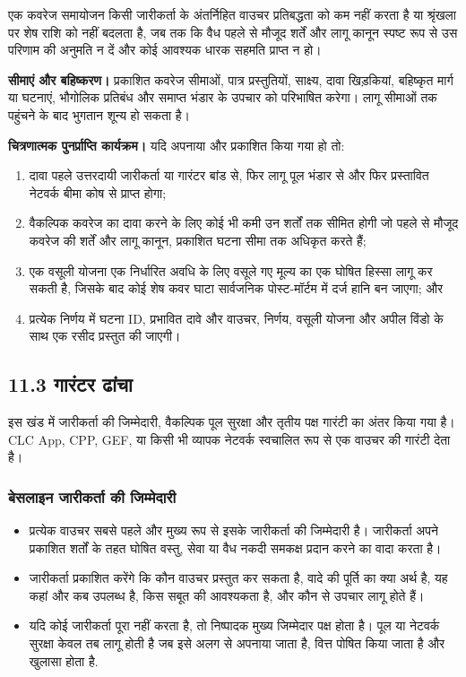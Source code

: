 \documentclass[11pt]{article}
\begin{document}
एक कवरेज समायोजन किसी जारीकर्ता के अंतर्निहित वाउचर प्रतिबद्धता को कम नहीं करता है या श्रृंखला पर शेष राशि को नहीं बदलता है, जब तक कि वैध पहले से मौजूद शर्तें और लागू कानून स्पष्ट रूप से उस परिणाम की अनुमति न दें और कोई आवश्यक धारक सहमति प्राप्त न हो।

\textbf{सीमाएं और बहिष्करण।} प्रकाशित कवरेज सीमाओं, पात्र प्रस्तुतियों, साक्ष्य, दावा खिड़कियां, बहिष्कृत मार्ग या घटनाएं, भौगोलिक प्रतिबंध और समाप्त भंडार के उपचार को परिभाषित करेगा। लागू सीमाओं तक पहुंचने के बाद भुगतान शून्य हो सकता है।

\textbf{चित्रणात्मक पुनर्प्राप्ति कार्यक्रम।} यदि अपनाया और प्रकाशित किया गया हो तो:

\begin{enumerate}[leftmargin=*]
\item दावा पहले उत्तरदायी जारीकर्ता या गारंटर बांड से, फिर लागू पूल भंडार से और फिर प्रस्तावित नेटवर्क बीमा कोष से प्राप्त होगा;
\item वैकल्पिक कवरेज का दावा करने के लिए कोई भी कमी उन शर्तों तक सीमित होगी जो पहले से मौजूद कवरेज की शर्तें और लागू कानून, प्रकाशित घटना सीमा तक अधिकृत करते हैं;
\item एक वसूली योजना एक निर्धारित अवधि के लिए वसूले गए मूल्य का एक घोषित हिस्सा लागू कर सकती है, जिसके बाद कोई शेष कवर घाटा सार्वजनिक पोस्ट-मॉर्टम में दर्ज हानि बन जाएगा; और
\item प्रत्येक निर्णय में घटना ID, प्रभावित दावे और वाउचर, निर्णय, वसूली योजना और अपील विंडो के साथ एक रसीद प्रस्तुत की जाएगी।
\end{enumerate}
\subsection*{11.3 गारंटर ढांचा}

इस खंड में जारीकर्ता की जिम्मेदारी, वैकल्पिक पूल सुरक्षा और तृतीय पक्ष गारंटी का अंतर किया गया है।CLC App, CPP, GEF, या किसी भी व्यापक नेटवर्क स्वचालित रूप से एक वाउचर की गारंटी देता है।

\subsubsection*{बेसलाइन जारीकर्ता की जिम्मेदारी}

\begin{itemize}[leftmargin=*]
\item प्रत्येक वाउचर सबसे पहले और मुख्य रूप से इसके जारीकर्ता की जिम्मेदारी है। जारीकर्ता अपने प्रकाशित शर्तों के तहत घोषित वस्तु, सेवा या वैध नकदी समकक्ष प्रदान करने का वादा करता है।
\item जारीकर्ता प्रकाशित करेंगे कि कौन वाउचर प्रस्तुत कर सकता है, वादे की पूर्ति का क्या अर्थ है, यह कहां और कब उपलब्ध है, किस सबूत की आवश्यकता है, और कौन से उपचार लागू होते हैं।
\item यदि कोई जारीकर्ता पूरा नहीं करता है, तो निष्पादक मुख्य जिम्मेदार पक्ष होता है। पूल या नेटवर्क सुरक्षा केवल तब लागू होती है जब इसे अलग से अपनाया जाता है, वित्त पोषित किया जाता है और खुलासा होता है.
\end{itemize}
\end{document}
